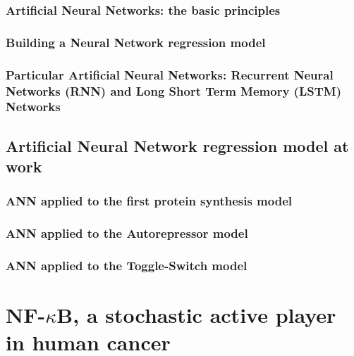 \documentclass[12pt,a4paper]{report}
\begin{document}
\section{Artificial Neural Networks: the basic principles}

\section{Building a Neural Network regression model}

\section{Particular Artificial Neural Networks: Recurrent Neural Networks (RNN) and Long Short Term Memory (LSTM) Networks}

\chapter{Artificial Neural Network regression model at work}
\section{ANN applied to the first protein synthesis model}
\section{ANN applied to the Autorepressor model}
\section{ANN applied to the Toggle-Switch model}

\part{NF-\texorpdfstring{$\kappa$}{}B, a stochastic active player in human cancer}
\end{document}
